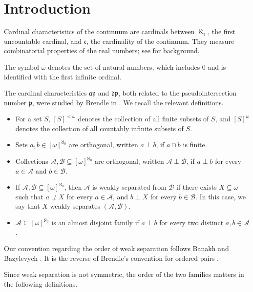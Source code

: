 \section{Introduction}

Cardinal characteristics of the continuum are cardinals between $\aleph_1$,
the first uncountable cardinal, and $\mathfrak c$, the cardinality of the
continuum. They measure combinatorial properties of the real numbers; see
\cite{blass2009combinatorial} for background.

The symbol $\omega$ denotes the set of natural numbers, which includes $0$ and is identified with the first infinite ordinal.

The cardinal characteristics $\mathfrak{ap}$ and $\mathfrak{dp}$, both related
to the pseudointersection number $\mathfrak p$, were studied by Brendle in
\cite{brendle1999dow}. We recall the relevant definitions.

\begin{itemize}
    \item For a set $S$, $[S]^{<\omega}$ denotes the collection of all finite subsets of $S$, and $[S]^\omega$ denotes the collection of all countably infinite subsets of $S$.
    \item Sets $a,b\in[\omega]^{\aleph_0}$ are orthogonal, written $a\perp b$, if $a\cap b$ is finite.
    \item Collections $\mathcal A,\mathcal B\subseteq[\omega]^{\aleph_0}$ are orthogonal, written $\mathcal A\perp\mathcal B$, if $a\perp b$ for every $a\in\mathcal A$ and $b\in\mathcal B$.
    \item If $\mathcal A,\mathcal B\subseteq[\omega]^{\aleph_0}$, then $\mathcal A$ is weakly separated from $\mathcal B$ if there exists $X\subseteq\omega$ such that $a\not\perp X$ for every $a\in\mathcal A$, and $b\perp X$ for every $b\in\mathcal B$. In this case, we say that $X$ weakly separates $(\mathcal A,\mathcal B)$.
    \item $\mathcal A\subseteq[\omega]^{\aleph_0}$ is an almost disjoint family if $a\perp b$ for every two distinct $a,b\in\mathcal A$.
\end{itemize}

Our convention regarding the order of weak separation follows Banakh and Bazylevych \cite{banakh2023q}.  It is the reverse of Brendle's convention for ordered pairs \cite{brendle1999dow}.

Since weak separation is not symmetric, the order of the two families matters in
the following definitions.

